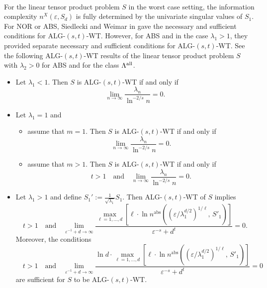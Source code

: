 \documentclass{amsart}
\numberwithin{equation}{section}
\def\vz{\varepsilon}
\def\lz{\lambda}
\begin{document}
\

For the linear tensor product problem $S$ in the worst case
setting, the information complexity $n^{X}(\vz,S_d )$ is fully
determined by the univariate singular values  of $S_1$. For NOR or
ABS, Siedlecki and Weimar in \cite[Theorems 3.9 and 3.10]{SW15}
gave the necessary and sufficient conditions for ALG-$(s,t)$-WT.
However, for ABS and in the case $\lambda_1>1$, they provided
separate necessary and sufficient conditions for ALG-$(s,t)$-WT.
See the following ALG-$(s,t)$-WT results of the linear tensor
product problem $S$ with $\lz_2>0$ for ABS and for the class
$\Lambda^{\rm all}$.


    \begin{itemize}
        \item Let $\lambda_1<1$. Then $S$ is ALG-$(s,t)$-WT if and only if
            \begin{equation}\label{1.2}
                \lim_{n\to\infty}\frac{\lambda_n}{\ln^{-2/s}n}=0.
            \end{equation}
        \item Let $\lambda_1=1$ and
            \begin{itemize}
                \item[(1)] assume that $m=1$. Then $S$ is ALG-$(s,t)$-WT if and only if
                    \begin{equation*}
                        \lim_{n\to\infty}\frac{\lambda_n}{\ln^{-2/s}n}=0.
                    \end{equation*}
                \item[(2)] assume that $m>1$. Then $S$ is ALG-$(s,t)$-WT if and only if
                    \begin{equation*}
                        t>1
                        \quad \text{and} \quad
                        \lim_{n\to\infty}\frac{\lambda_n}{\ln^{-2/s}n}=0.
                    \end{equation*}
            \end{itemize}
        \item Let $\lambda_1>1$ and define $S_1':=\frac{1}{\sqrt{\lambda_1}} S_1$. Then ALG-$(s,t)$-WT of $S$ implies
    \begin{equation*}
        t>1
        \quad \text{and} \quad
        \lim_{\vz^{-1}+d\to\infty} \frac{\max_{\ell=1,\ldots,d}\limits \left[ \ell \cdot \ln n^{\mathrm{abs}}\!\left( ( \vz / \lambda_1^{d/2} )^{1/\ell},\, S'_1 \right) \right]}{\vz^{-s}+d^{t}}
        = 0.
    \end{equation*}
        Moreover, the conditions
    \begin{equation*}
        \quad t>1
        \quad \text{and} \quad
        \lim_{\vz^{-1}+d\to\infty} \frac{\ln d \cdot \max_{\ell=1,\dots,d}\limits \left[ \ell \cdot \ln n^{\mathrm{abs}}\!\left( ( \vz /\lambda_1^{d/2} )^{1/\ell},\, S'_1 \right) \right]}{\vz^{-s}+d^{t}}
        = 0
    \end{equation*}
    are sufficient for $S$ to be ALG-$(s,t)$-WT.
    \end{itemize}
\end{document}
